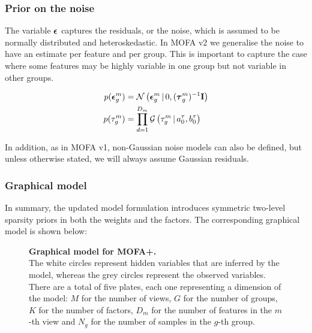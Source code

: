 \subsubsection{Prior on the noise}

The variable $\mbox{\boldmath $\epsilon$}$ captures the residuals, or the noise, which is assumed to be normally distributed and heteroskedastic. In MOFA v2 we generalise the noise to have an estimate per feature and per group. This is important to capture the case where some features may be highly variable in one group but not variable in other groups.

\begin{align}
	p(\mbox{\boldmath $\epsilon$}^{m}_{g}) &= \mathcal{N}\left(\mbox{\boldmath $\epsilon$}^{m}_{g} \,|\, 0,(\mbox{\boldmath $\tau$}^{m}_{g})^{-1}{\bf I}\right) \\
	p(\tau^{m}_{g}) &= \prod_{d=1}^{D_m} \mathcal{G}\left(\tau^{m}_{g} \,|\, a_0^\tau, b_0^\tau\right)
\end{align}

In addition, as in MOFA v1, non-Gaussian noise models can also be defined, but unless otherwise stated, we will always assume Gaussian residuals.


\subsubsection{Graphical model}

In summary, the updated model formulation introduces symmetric two-level sparsity priors in both the weights and the factors. The corresponding graphical model is shown below:
\begin{figure}[H]
	\centering	
	
	\caption{\textbf{Graphical model for MOFA+.}\\
	The white circles represent hidden variables that are inferred by the model, whereas the grey circles represent the observed variables. There are a total of five plates, each one representing a dimension of the model: $M$ for the number of views, $G$ for the number of groups, $K$ for the number of factors, $D_m$ for the number of features in the $m$-th view and $N_g$ for the number of samples in the $g$-th group.
	}
	\label{fig:MOFA2}
\end{figure}

